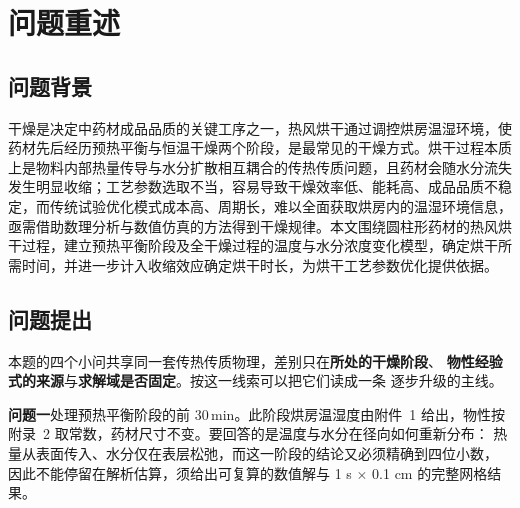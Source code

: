 \documentclass[withoutpreface,bwprint]{cumcmthesis} %
\begin{document}
\begin{abstract}
\textbf{模型检验}贯穿四问：问题四关闭收缩后与问题三逐位一致；独立有限体积格式外推极限仅差 $0.0016\,\mathrm{h}$，与问题二格式重叠时段最大偏差 $3.98\times10^{-5}\,\mathrm{kg/kg}$；蒙特卡洛 $95\%$ 区间 $[32.4,\,87.5]\,\mathrm{h}$ 远大于数值误差 $\pm0.011\,\mathrm{h}$。

全文模型物理图像统一，数值误差远小于物理不确定度，主要局限是收缩模式缺内部数据支撑；给出了可直接用于排湿与工期决策的烘干时间与完整温度、水分场演化。

 \end{abstract}


\section{问题重述}

\subsection{问题背景}

干燥是决定中药材成品品质的关键工序之一，热风烘干通过调控烘房温湿环境，使药材先后经历预热平衡与恒温干燥两个阶段，是最常见的干燥方式。烘干过程本质上是物料内部热量传导与水分扩散相互耦合的传热传质问题，且药材会随水分流失发生明显收缩；工艺参数选取不当，容易导致干燥效率低、能耗高、成品品质不稳定，而传统试验优化模式成本高、周期长，难以全面获取烘房内的温湿环境信息，亟需借助数理分析与数值仿真的方法得到干燥规律。本文围绕圆柱形药材的热风烘干过程，建立预热平衡阶段及全干燥过程的温度与水分浓度变化模型，确定烘干所需时间，并进一步计入收缩效应确定烘干时长，为烘干工艺参数优化提供依据。

\subsection{问题提出}

本题的四个小问共享同一套传热传质物理，差别只在\textbf{所处的干燥阶段}、
\textbf{物性经验式的来源}与\textbf{求解域是否固定}。按这一线索可以把它们读成一条
逐步升级的主线。

\textbf{问题一}处理预热平衡阶段的前 $30\,\mathrm{min}$。此阶段烘房温湿度由附件~1
给出，物性按附录~2 取常数，药材尺寸不变。要回答的是温度与水分在径向如何重新分布：
热量从表面传入、水分仅在表层松弛，而这一阶段的结论又必须精确到四位小数，
因此不能停留在解析估算，须给出可复算的数值解与 1 s $\times$ 0.1 cm 的完整网格结果。
\end{document}
